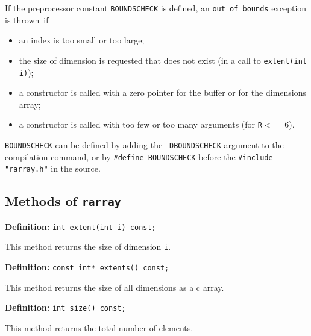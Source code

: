 \documentclass[12pt,twoside]{article}
\begin{document}
If the preprocessor constant \texttt{{\tt BOUNDSCHECK}} is defined, an
\texttt{out\_of\_bounds} exception is thrown~if
\begin{itemize}\itemsep0pt\parskip3pt
\item an index is too small or too large;
\item the size of dimension is requested that does not exist (in a call to \texttt{extent(int i)});
\item a constructor is called with a zero pointer for the buffer or for the dimensions array;
\item a constructor is called with too few or too many arguments (for \texttt{R}$<=6$).
\end{itemize}
\texttt{{\tt BOUNDSCHECK}} can be defined by
adding the {\tt -DBOUNDSCHECK} argument to the compilation command, or
by \texttt{{\tt\#define BOUNDSCHECK}} before
the \texttt{{\tt\#include "rarray.h"}} in the source.

\pagebreak[4]
\subsection{Methods of {\tt rarray}}

\noindent\textbf{Definition:} \texttt{int extent(int i) const;}

This method returns the size of dimension \texttt{i}.

\noindent\textbf{Definition:} \texttt{const int* extents() const;}

This method returns the size of all dimensions as a c array. 

\noindent\textbf{Definition:} \texttt{int size() const;}

This method returns the total number of elements.
\end{document}
